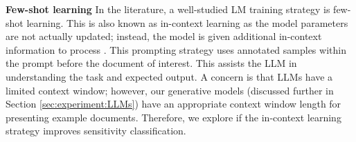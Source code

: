 \textbf{Few-shot learning}
In the literature, a well-studied LM training strategy is few-shot learning. This is also known as in-context learning as the model parameters are not actually updated; instead, the model is given additional in-context information to process \cite{gao2020making, brown2020language}. This prompting strategy uses annotated samples within the prompt before the document of interest. This assists the LLM in understanding the task and expected output. A concern is that LLMs have a limited context window; however, our generative models (discussed further in Section \ref{sec:experiment:LLMs}) have an appropriate context window length for presenting example documents. Therefore, we explore if the in-context learning strategy improves sensitivity classification.
